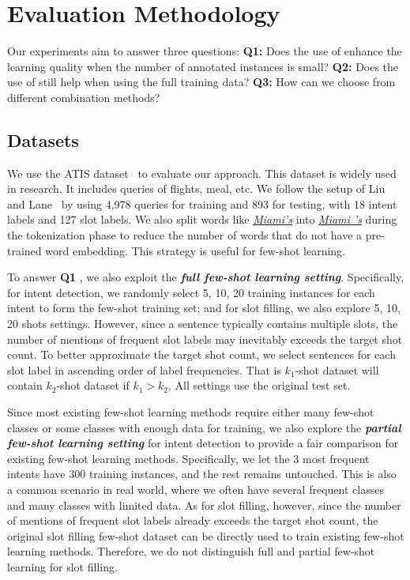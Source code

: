 \section{Evaluation Methodology}
Our experiments
aim to %
answer three questions: \textbf{Q1:} Does the use of \REs enhance the learning quality when the number of annotated
instances is small?  \textbf{Q2:}  Does the use of \REs still help when using the full training data?
 \textbf{Q3:}  How can we choose from different combination methods?

\subsection{Datasets}
\label{sec_datasest}

We use the ATIS dataset~\cite{hemphill1990atis} to evaluate our approach. This dataset is widely used in \SLU research. It includes queries
of flights, meal, etc. We follow the setup of Liu and Lane~ by using 4,978 queries for training and 893 for
testing, with 18 intent labels and 127 slot labels.
We also split words like \textsl{\underline{Miami's}} into \textsl{\underline{Miami 's}} during the tokenization phase to reduce the number
of words that do not have a pre-trained word embedding. This strategy is useful for few-shot learning.

To answer  \textbf{Q1} , we also exploit the \textbf{\emph{full few-shot learning setting}}. Specifically, for intent detection, we
randomly select 5, 10, 20 training instances for each intent to form the few-shot training set; and for slot filling, we also explore 5,
10, 20 shots settings. However, since a sentence typically contains multiple slots, the number of mentions of frequent slot labels may
inevitably exceeds the target shot count. To better approximate the target shot count, we select sentences for each slot label  in
ascending order of label frequencies. That is $k_1$-shot dataset will contain $k_2$-shot dataset if $k_1>k_2$. All settings use the
original test set.

Since most existing few-shot learning methods require either many few-shot classes or some classes with enough data for training, we also
explore the \textbf{\emph{partial few-shot learning setting}} for intent detection to provide a fair comparison for existing few-shot
learning methods. Specifically, we let the 3 most frequent intents have 300 training instances, and the rest remains untouched. This is
also a common scenario in real world, where we often have several frequent classes and many classes with limited data. As for slot filling,
however, since the number of mentions of frequent slot labels already exceeds the target shot count, the original slot filling few-shot
dataset can be directly used to train existing few-shot learning methods. Therefore, we do not distinguish full and partial few-shot
learning for slot filling.

